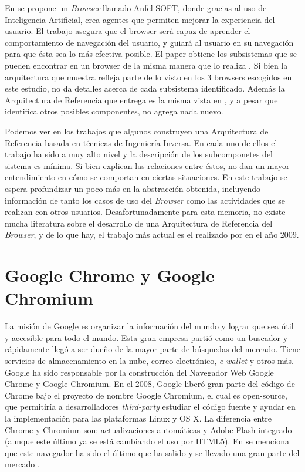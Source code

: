 En \cite{Lwin2009} se propone un \textit{Browser} llamado Anfel SOFT, donde gracias al uso de Inteligencia Artificial, crea agentes que permiten mejorar la experiencia del usuario. El trabajo asegura que el browser será capaz de aprender el comportamiento de navegación del usuario, y guiará al usuario en su navegación para que ésta sea lo más efectiva posible. El paper obtiene los subsistemas que se pueden encontrar en un browser de la misma manera que lo realiza \cite{2005-grosskurth-browser-refarch}. Si bien la arquitectura que muestra refleja parte de lo visto en los 3 browsers escogidos en este estudio, no da detalles acerca de cada subsistema identificado. Además la Arquitectura de Referencia que entrega es la misma vista en \cite{2005-grosskurth-browser-refarch, preprint-grosskurth-browser-archevol}, y a pesar que identifica otros posibles componentes, no agrega nada nuevo.

Podemos ver en los trabajos que algunos construyen una Arquitectura de Referencia basada en técnicas de Ingeniería Inversa. En cada uno de ellos el trabajo ha sido a muy alto nivel y la descripción de los subcomponetes del sistema es mínima. Si bien explican las relaciones entre éstos, no dan un mayor entendimiento en cómo se comportan en ciertas situaciones. En este trabajo se espera profundizar un poco más en la abstracción obtenida, incluyendo información de tanto los casos de uso del \textit{Browser} como las actividades que se realizan con otros usuarios. Desafortunadamente para esta memoria, no existe mucha literatura sobre el desarrollo de una Arquitectura de Referencia del \textit{Browser}, y de lo que hay, el trabajo más actual es el realizado por \cite{Lwin2009} en el año 2009.


\section{Google Chrome y Google Chromium}
    \label{chap3:GC}
    La misión de Google es organizar la información del mundo y lograr que sea útil y accesible para todo el mundo. Esta gran empresa partió como un buscador y rápidamente llegó a ser dueño de la mayor parte de búsquedas del mercado. Tiene servicios de almacenamiento en la nube, correo electrónico, \textit{e-wallet} y otros más. Google ha sido responsable por la construcción del Navegador Web Google Chrome y Google Chromium. En el 2008, Google liberó gran parte del código de Chrome bajo el proyecto de nombre Google Chromium, el cual es open-source, que permitiría a desarrolladores \textit{third-party} estudiar el código fuente y ayudar en la implementación para las plataformas Linux y OS X. La diferencia entre Chrome y Chromium son: actualizaciones automáticas y Adobe Flash integrado (aunque este último ya se está cambiando el uso por HTML5). En  \cite{EvolutionofWeb} se menciona que este navegador ha sido el último que ha salido y se llevado una gran parte del mercado \cite{statBrow}.

